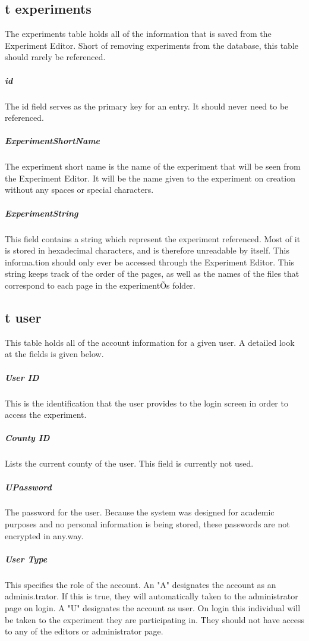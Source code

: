 \documentclass[article]{ij4uq}              %
\begin{document}
\subsection{t experiments }
The experiments table holds all of the information that is saved from the Experiment Editor. Short of removing experiments from the database, this table should rarely be referenced. 

\subparagraph{id} 
The id field serves as the primary key for an entry. It should never need to be referenced. 

\subparagraph{ExperimentShortName}
The experiment short name is the name of the experiment that will be seen from the Experiment Editor. It will be the name given to the experiment on creation without any spaces or special characters. 

\subparagraph{ExperimentString}
This field contains a string which represent the experiment referenced. Most of it is stored in hexadecimal characters, and is therefore unreadable by itself. This informa.tion should only ever be accessed through the Experiment Editor. This string keeps track of the order of the pages, as well as the names of the files that correspond to each page in the experimentÕs folder. 


\subsection{t user}
This table holds all of the account information for a given user. A detailed look at the fields is given below.

\subparagraph{User ID}
This is the identification that the user provides to the login screen in order to access the experiment. 

\subparagraph{County ID}
Lists the current county of the user. This field is currently not used. 

\subparagraph{UPassword}
The password for the user. Because the system was designed for academic purposes and no personal information is being stored, these passwords are not encrypted in any.way.

\subparagraph{User Type}
This specifies the role of the account. An "A" designates the account as an adminis.trator. If this is true, they will automatically taken to the administrator page on login. A "U" designates the account as user. On login this individual will be taken to the experiment they are participating in. They should not have access to any of the editors or administrator page. 
\end{document}
